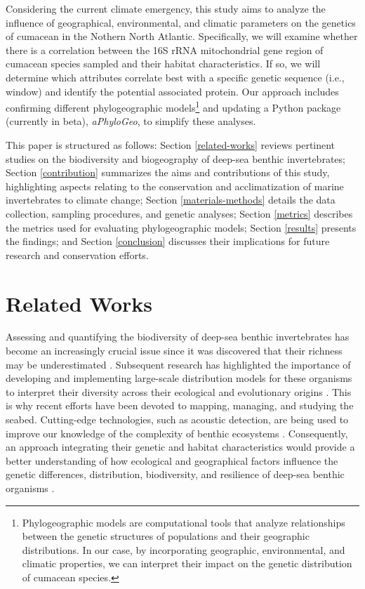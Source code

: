 Considering the current climate emergency, this study aims to analyze the influence of geographical, environmental, and climatic parameters on the genetics of cumacean in the Nothern North Atlantic. Specifically, we will examine whether there is a correlation between the 16S rRNA mitochondrial gene region of cumacean species sampled and their habitat characteristics. If so, we will determine which attributes correlate best with a specific genetic sequence (i.e., window) and identify the potential associated protein. Our approach includes confirming different {phylogeographic models}\footnote{Phylogeographic models are computational tools that analyze relationships between the genetic structures of populations and their geographic distributions. In our case, by incorporating geographic, environmental, and climatic properties, we can interpret their impact on the genetic distribution of cumacean species.} and updating a Python package (currently in beta), \textit{aPhyloGeo}, to simplify these analyses.

This paper is structured as follows: Section \autoref{related-works} reviews pertinent studies on the biodiversity and biogeography of deep-sea benthic invertebrates; Section \autoref{contribution} summarizes the aims and contributions of this study, highlighting aspects relating to the conservation and acclimatization of marine invertebrates to climate change; Section \autoref{materials-methods} details the data collection, sampling procedures, and genetic analyses; Section \autoref{metrics} describes the metrics used for evaluating phylogeographic models; Section \autoref{results} presents the findings; and Section \autoref{conclusion}  discusses their implications for future research and conservation efforts.

\section{Related Works}\label{related-works}
Assessing and quantifying the biodiversity of deep-sea benthic invertebrates has become an increasingly crucial issue since it was discovered that their richness may be underestimated \citep{grassle1992deep}. Subsequent research has highlighted the importance of developing and implementing large-scale distribution models for these organisms to interpret their diversity across their ecological and evolutionary origins \citep{rex1997large}. This is why recent efforts have been devoted to mapping, managing, and studying the seabed. Cutting-edge technologies, such as acoustic detection, are being used to improve our knowledge of the complexity of benthic ecosystems \citep{brown2011benthic}. Consequently, an approach integrating their genetic and habitat characteristics would provide a better understanding of how ecological and geographical factors influence the genetic differences, distribution, biodiversity, and resilience of deep-sea benthic organisms \citep{etter1990population, vrijenhoek2009cryptic}.

